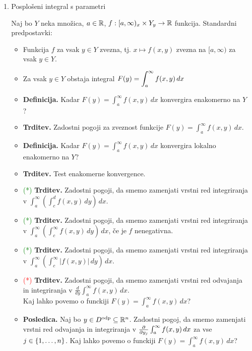 \begin{enumerate}
    \item Posplošeni integral s parametri
    
    Naj bo $Y$ neka množica, $a \in \mathbb{R}$, $f: [a, \infty)_x \times Y_y \to \mathbb{R}$ funkcija. Standardni predpostavki:
    \begin{itemize}
        \item[] Funkcija $f$ za vsak $y \in Y$ zvezna, tj. $x \mapsto f(x,y)$ zvezna na $[a, \infty)$ za vsak \(y \in Y\).
        \item[] Za vsak \(y \in Y\) obstaja integral \( \displaystyle F(y)= \int_{a}^{\infty} f(x,y) \,dx \)
    \end{itemize}
    \begin{itemize}
        \item \textbf{Definicija.} Kadar \( F(y) = \int_{a}^{\infty} f(x,y) \, dx\) konvergira enakomerno na \(Y\)?
        \item \textbf{Trditev.} Zadostni pogoji za zveznost funkcije $F(y) = \int_{a}^{\infty} f(x,y) \, dx$.
        \item \textbf{Definicija.} Kadar \( F(y) = \int_{a}^{\infty} f(x,y) \, dx\) konvergira lokalno enakomerno na \(Y\)?
        \item \textbf{Trditev.} Test enakomerne konvergence.
        \item \textcolor{green}{(*)} \textbf{Trditev.} Zadostni pogoji, da smemo zamenjati vrstni red integriranja v \(\int_{a}^{\infty}\left(\int_{c}^{d} f(x,y) \, dy\right) \, dx\).
        \item \textcolor{green}{(*)} \textbf{Trditev.} Zadostni pogoji, da smemo zamenjati vrstni red integriranja v \(\int_{a}^{\infty}\left(\int_{c}^{\infty} f(x,y) \, dy\right) \, dx\), če je $f$ nenegativna.
        \item \textcolor{green}{(*)} \textbf{Trditev.} Zadostni pogoji, da smemo zamenjati vrstni red integriranja v \(\int_{a}^{\infty}\left(\int_{c}^{\infty} |f(x,y)| \, dy\right) \, dx\).
        \item \textcolor{red}{(*)} \textbf{Trditev.} Zadostni pogoji, da smemo zamenjati vrstni red odvajanja in integriranja v \(\frac{d}{dy} \int_{a}^{\infty}f(x,y) \, dx\).
        \\ Kaj lahko povemo o funckiji $F(y) = \int_{a}^{\infty}f(x,y) \, dx$?
        \item \textbf{Posledica.} Naj bo \(y \in D^\text{odp} \subseteq \mathbb{R}^n\). Zadostni pogoj, da smemo zamenjati vrstni red odvajanja in integriranja v \(\frac{\partial }{\partial y_j} \int_{a}^{\infty}f(x,y) \, dx\) za vse \(j \in \left\{1, \ldots, n\right\}\).  Kaj lahko povemo o funckiji $F(y) = \int_{a}^{\infty}f(x,y) \, dx$?

\end{itemize}
\end{enumerate}

